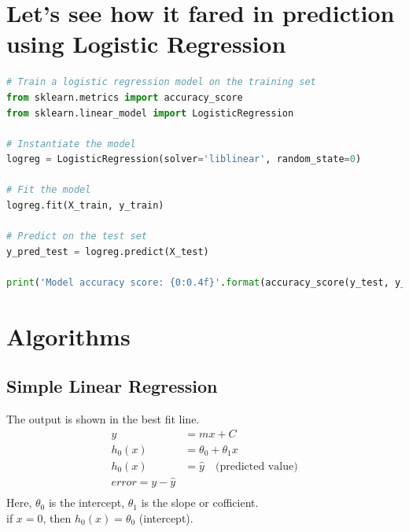 \documentclass{article}
\begin{document}
\section{Let’s see how it fared in prediction using Logistic Regression}
\begin{center}
\begin{lstlisting}[language=Python, caption={Logistic Regression Example}, label={lst:logreg}, backgroundcolor=\color{gray!10}, frame=single, keywordstyle=\color{blue}\bfseries, commentstyle=\color{green!50!black}, stringstyle=\color{orange}]
# Train a logistic regression model on the training set
from sklearn.metrics import accuracy_score
from sklearn.linear_model import LogisticRegression

# Instantiate the model
logreg = LogisticRegression(solver='liblinear', random_state=0)

# Fit the model
logreg.fit(X_train, y_train)

# Predict on the test set
y_pred_test = logreg.predict(X_test)

print('Model accuracy score: {0:0.4f}'.format(accuracy_score(y_test, y_pred_test)))
\end{lstlisting}
\end{center}
\vspace{1cm} %


\section{Algorithms}
\subsection{Simple Linear Regression}
The output is shown in the best fit line.
\begin{align*}
    y &= mx + C \\
    h_0(x) &= \theta_0 + \theta_1 x \\
    h_0(x) &= \hat{y}  \quad \text{(predicted value)} \\
    error= y - \hat{y} \\
\end{align*}
Here, $\theta_0$ is the intercept, $\theta_1$ is the slope or cofficient.\\
if $x=0$, then $h_0(x) = \theta_0$ (intercept).\\
\end{document}
